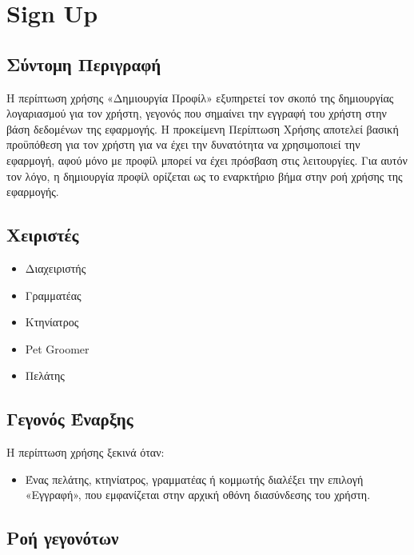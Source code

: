 \documentclass[12pt,a4paper,twoside]{book}
\begin{document}
\section{Sign Up}

\subsection{Σύντομη Περιγραφή}
Η περίπτωση χρήσης «Δημιουργία Προφίλ» εξυπηρετεί τον σκοπό της δημιουργίας λογαριασμού για τον χρήστη, γεγονός που σημαίνει την εγγραφή του χρήστη στην βάση δεδομένων της εφαρμογής. Η προκείμενη Περίπτωση Χρήσης αποτελεί βασική προϋπόθεση για τον χρήστη για να έχει την δυνατότητα να χρησιμοποιεί την εφαρμογή, αφού μόνο με προφίλ μπορεί να έχει πρόσβαση στις λειτουργίες. Για αυτόν τον λόγο, η δημιουργία προφίλ ορίζεται ως το εναρκτήριο βήμα στην ροή χρήσης της εφαρμογής. %

\subsection{Χειριστές}
\begin{itemize}
  \item Διαχειριστής
  \item Γραμματέας
  \item Κτηνίατρος
  \item Pet Groomer
  \item Πελάτης
\end{itemize}

\subsection{Γεγονός Έναρξης}
Η περίπτωση χρήσης ξεκινά όταν:
\begin{itemize}
  \item Ένας πελάτης, κτηνίατρος, γραμματέας ή κομμωτής διαλέξει την επιλογή «Εγγραφή», που εμφανίζεται στην αρχική οθόνη διασύνδεσης του χρήστη.  %
\end{itemize}

\subsection{Ροή γεγονότων}
\end{document}
